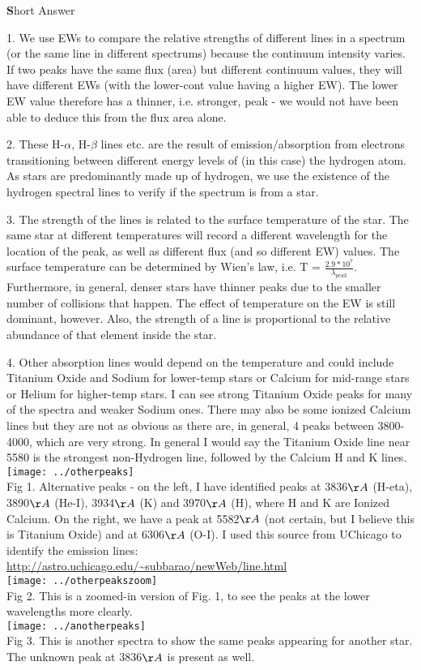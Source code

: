 \documentclass[12pt]{article}
\begin{document}
{\LARGE \textbf Short Answer}

1. We use EWs to compare the relative strengths of different lines in a spectrum (or the same line in different spectrums) because the continuum intensity varies. If two peaks have the same flux (area) but different continuum values, they will have different EWs (with the lower-cont value having a higher EW). The lower EW value therefore has a thinner, i.e. stronger, peak - we would not have been able to deduce this from the flux area alone.

2. These H-$\alpha$, H-$\beta$ lines etc. are the result of emission/absorption from electrons transitioning between different energy levels of (in this case) the hydrogen atom. As stars are predominantly made up of hydrogen, we use the existence of the hydrogen spectral lines to verify if the spectrum is from a star.

3. The strength of the lines is related to the surface temperature of the star. The same star at different temperatures will record a different wavelength for the location of the peak, as well as different flux (and so different EW) values. The surface temperature can be determined by Wien's law, i.e.
T = $ \frac{2.9*10^7}{\lambda_{peak}} $. Furthermore, in general, denser stars have thinner peaks due to the smaller number of collisions that happen. The effect of temperature on the EW is still dominant, however. Also, the strength of a line is proportional to the relative abundance of that element inside the star.

4. Other absorption lines would depend on the temperature and could include Titanium Oxide and Sodium for lower-temp stars or Calcium for mid-range stars or Helium for higher-temp stars. I can see strong Titanium Oxide peaks for many of the spectra and weaker Sodium ones. There may also be some ionized Calcium lines but they are not as obvious as there are, in general, 4 peaks between 3800-4000, which are very strong. In general I would say the Titanium Oxide line near 5580 is the strongest non-Hydrogen line, followed by the Calcium H and K lines.\\
\texttt{[image: ../otherpeaks]}\\
Fig 1. Alternative peaks - on the left, I have identified peaks at 3836$\AA$ (H-eta), 3890$\AA$ (He-I), 3934$\AA$ (K) and 3970$\AA$ (H), where H and K are Ionized Calcium.   On the right, we have a peak at 5582$\AA$ (not certain, but I believe this is Titanium Oxide) and at 6306$\AA$ (O-I). I used this source from UChicago to identify the emission lines: \url{http://astro.uchicago.edu/~subbarao/newWeb/line.html}\\
\texttt{[image: ../otherpeakszoom]}\\
Fig 2. This is a zoomed-in version of Fig. 1, to see the peaks at the lower wavelengths more clearly.\\
\texttt{[image: ../anotherpeaks]}\\
Fig 3. This is another spectra to show the same peaks appearing for another star. The unknown peak at 3836$\AA$ is present as well.\\
\end{document}
